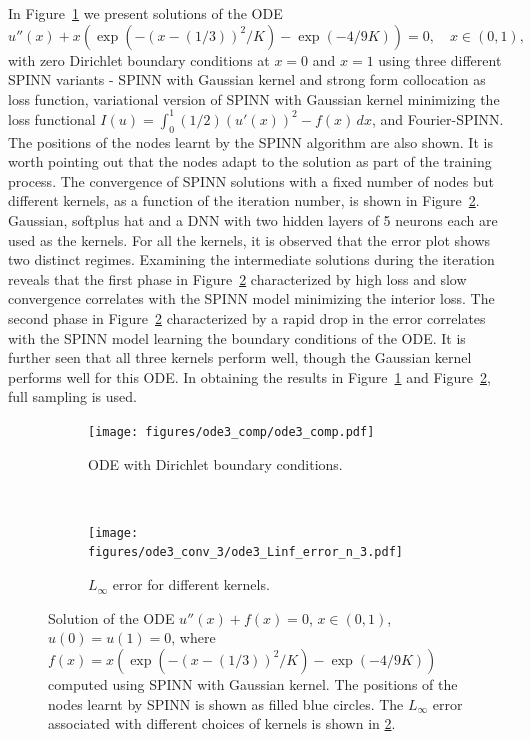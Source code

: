 \documentclass[12pt]{article}
\begin{document}
In Figure~\ref{fig:ode3_gaussian_n_3_comp} we present solutions of the ODE
\begin{displaymath}
u''(x) + x(\exp (-(x - (1/3))^2/K) - \exp (-4/9K)) = 0, \quad x\in (0,1),
\end{displaymath}
with zero Dirichlet boundary conditions at $x=0$ and $x=1$ using three different SPINN variants - SPINN with Gaussian kernel and strong form collocation as loss function, variational version of SPINN with Gaussian kernel minimizing the loss functional $I(u) = \int_0^1 (1/2)(u'(x))^2 - f(x)\, dx$, and Fourier-SPINN. The positions of the nodes learnt by the SPINN algorithm are also shown. It is worth pointing out that the nodes adapt to the solution as part of the training process. The convergence of SPINN solutions with a fixed number of nodes but different kernels, as a function of the iteration number, is shown in Figure~\ref{fig:ode3_Linf_n_3}. Gaussian, softplus hat and a DNN with two hidden layers of 5 neurons each are used as the kernels. For all the kernels, it is observed that the error plot shows two distinct regimes. Examining the intermediate solutions during the iteration reveals that the first phase in Figure~\ref{fig:ode3_Linf_n_3} characterized by high loss and slow convergence correlates with the SPINN model minimizing the interior loss. The second phase in Figure~\ref{fig:ode3_Linf_n_3} characterized by a rapid drop in the error correlates with the SPINN model learning the boundary conditions of the ODE. It is further seen that all three kernels perform well, though the Gaussian kernel performs well for this ODE. In obtaining the results in Figure~\ref{fig:ode3_gaussian_n_3_comp} and Figure~\ref{fig:ode3_Linf_n_3}, full sampling is used.

\begin{figure}[htpb]
\begin{subfigure}{0.5\textwidth}
\centering
\texttt{[image: figures/ode3\_comp/ode3\_comp.pdf]}
\caption{ODE with Dirichlet boundary conditions.}
\label{fig:ode3_gaussian_n_3_comp}
\end{subfigure}
~
\begin{subfigure}{0.5\textwidth}
\centering
\texttt{[image: figures/ode3\_conv\_3/ode3\_Linf\_error\_n\_3.pdf]}
\caption{$L_{\infty}$ error for different kernels.}
\label{fig:ode3_Linf_n_3}
\end{subfigure}
\caption{Solution of the ODE $u''(x) + f(x) = 0$, $x \in (0,1)$, $u(0) = u(1) = 0$, where $f(x) = x(\exp (-(x - (1/3))^2/K) - \exp (-4/9K))$ computed using SPINN with Gaussian kernel. The positions of the nodes learnt by SPINN is shown as filled blue circles. The $L_{\infty}$ error associated with different choices of kernels is shown in \ref{fig:ode3_Linf_n_3}.}
\label{fig:spinn_ode_3}
\end{figure}
\end{document}

